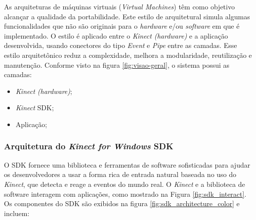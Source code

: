 As arquiteturas de máquinas virtuais (\textit{Virtual Machines}) têm como objetivo alcançar a qualidade da portabilidade. Este estilo de arquitetural simula algumas funcionalidades que não são originais para o \textit{hardware} e/ou \textit{software} em que é implementado. O estilo é aplicado entre o \textit{Kinect (hardware)} e a aplicação desenvolvida, usando conectores do tipo \textit{Event} e \textit{Pipe} entre as camadas. Esse estilo arquitetônico reduz a complexidade, melhora a modularidade, reutilização e manutenção.
Conforme visto na figura \ref{fig:visao-geral}, o sistema possui as camadas:

\begin{itemize}
\item \textit{Kinect (hardware)};
\item \textit{Kinect} SDK; 
\item Aplicação; 
\end{itemize}

\subsubsection{Arquitetura do \textit{Kinect for Windows} SDK}\label{sec:kinectSDK}
O SDK fornece uma biblioteca e ferramentas de software sofisticadas para ajudar os desenvolvedores a usar a forma rica de entrada natural baseada no uso do \textit{Kinect}, que detecta e reage a eventos do mundo real. O \textit{Kinect} e a biblioteca de software interagem com aplicações, como mostrado na Figura \ref{fig:sdk_interact}. Os componentes do SDK são exibidos na figura \ref{fig:sdk_architecture_color} e incluem:


